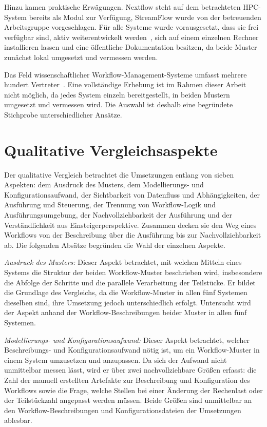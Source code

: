 Hinzu kamen praktische Erwägungen. Nextflow steht auf dem
betrachteten HPC-System bereits als Modul zur Verfügung, StreamFlow
wurde von der betreuenden Arbeitsgruppe vorgeschlagen.
Für alle Systeme wurde vorausgesetzt, dass sie frei verfügbar sind, aktiv
weiterentwickelt werden~\cite{wcisystems}, sich auf einem einzelnen
Rechner installieren lassen und eine öffentliche Dokumentation
besitzen, da beide Muster zunächst lokal umgesetzt und vermessen
werden.

Das Feld wissenschaftlicher Workflow-Management-Systeme umfasst
mehrere hundert Vertreter~\cite{suter2026terminology,wcisystems}.
Eine vollständige Erhebung ist im Rahmen dieser Arbeit nicht
möglich, da jedes System einzeln bereitgestellt, in beiden Mustern
umgesetzt und vermessen wird. Die Auswahl ist deshalb eine
begründete Stichprobe unterschiedlicher Ansätze.

\section{Qualitative Vergleichsaspekte}
\label{sec:methodik:qualitativ}
Der qualitative Vergleich betrachtet die Umsetzungen entlang von
sieben Aspekten: dem Ausdruck des Musters, dem Modellierungs- und
Konfigurationsaufwand, der Sichtbarkeit von Datenfluss und Abhängigkeiten, der
Ausführung und Steuerung, der Trennung von Workflow-Logik und
Ausführungsumgebung, der Nachvollziehbarkeit der Ausführung 
und der Verständlichkeit aus Einsteigerperspektive. Zusammen decken sie den
Weg eines Workflows von der Beschreibung über die Ausführung bis
zur Nachvollziehbarkeit ab. Die folgenden Absätze
begründen die Wahl der einzelnen Aspekte.

\emph{Ausdruck des Musters:} Dieser Aspekt betrachtet, mit welchen Mitteln eines Systems die Struktur der beiden Workflow-Muster beschrieben wird, insbesondere die Abfolge der Schritte und die parallele Verarbeitung der Teilstücke. Er bildet die Grundlage des Vergleichs, da die Workflow-Muster in allen fünf Systemen dieselben sind, ihre Umsetzung jedoch unterschiedlich erfolgt. Untersucht wird der Aspekt anhand der Workflow-Beschreibungen beider Muster in allen fünf Systemen.

\emph{Modellierungs- und Konfigurationsaufwand:} Dieser Aspekt betrachtet, welcher Beschreibungs- und Konfigurationsaufwand nötig ist, um ein Workflow-Muster in einem System umzusetzen und anzupassen. Da sich der Aufwand nicht unmittelbar messen lässt, wird er über zwei nachvollziehbare Größen erfasst: die Zahl der manuell erstellten Artefakte zur Beschreibung und Konfiguration des
Workflows sowie die Frage, welche Stellen bei einer Änderung der Rechenlast oder der Teilstückzahl angepasst werden müssen. Beide Größen sind unmittelbar an den Workflow-Beschreibungen und Konfigurationsdateien der Umsetzungen ablesbar.

